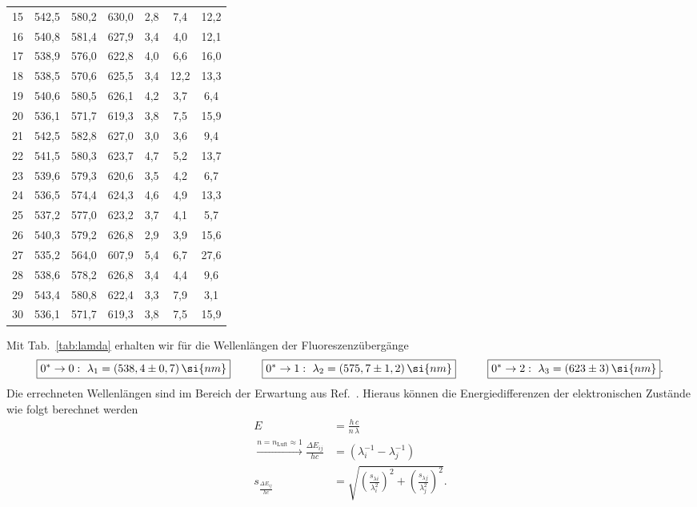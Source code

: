 \begin{table}[h!]
\begin{tabular}{c|c|c|c|c|c|c}
      15    & 542,5 & 580,2 & 630,0 & 2,8   & 7,4   & 12,2 \\
      16    & 540,8 & 581,4 & 627,9 & 3,4   & 4,0   & 12,1 \\
      17    & 538,9 & 576,0 & 622,8 & 4,0   & 6,6   & 16,0 \\
      18    & 538,5 & 570,6 & 625,5 & 3,4   & 12,2  & 13,3 \\
      19    & 540,6 & 580,5 & 626,1 & 4,2   & 3,7   & 6,4 \\
      20    & 536,1 & 571,7 & 619,3 & 3,8   & 7,5   & 15,9 \\
      21    & 542,5 & 582,8 & 627,0 & 3,0   & 3,6   & 9,4 \\
      22    & 541,5 & 580,3 & 623,7 & 4,7   & 5,2   & 13,7 \\
      23    & 539,6 & 579,3 & 620,6 & 3,5   & 4,2   & 6,7 \\
      24    & 536,5 & 574,4 & 624,3 & 4,6   & 4,9   & 13,3 \\
      25    & 537,2 & 577,0 & 623,2 & 3,7   & 4,1   & 5,7 \\
      26    & 540,3 & 579,2 & 626,8 & 2,9   & 3,9   & 15,6 \\
      27    & 535,2 & 564,0 & 607,9 & 5,4   & 6,7   & 27,6 \\
      28    & 538,6 & 578,2 & 626,8 & 3,4   & 4,4   & 9,6 \\
      29    & 543,4 & 580,8 & 622,4 & 3,3   & 7,9   & 3,1 \\
      30    & 536,1 & 571,7 & 619,3 & 3,8   & 7,5   & 15,9 \\
      \end{tabular}   
\end{table} \FloatBarrier
Mit Tab.~\ref{tab:lamda} erhalten wir für die Wellenlängen der Fluoreszenzübergänge
\begin{equation}
    \fbox{$0^{*}\rightarrow0:\,\,\lambda_{1} = (538,4 \pm 0,7)\,\si{nm}$}\hspace{1cm}
    \fbox{$0^{*}\rightarrow1:\,\,\lambda_{2} = (575,7 \pm 1,2)\,\si{nm}$}\hspace{1cm}
    \fbox{$0^{*}\rightarrow2:\,\,\lambda_{3} = (623 \pm 3)\,\si{nm}$}.
\end{equation}
Die errechneten Wellenlängen sind im Bereich der Erwartung aus Ref.~\cite{Anleitung}.
Hieraus können die Energiedifferenzen der elektronischen Zustände wie folgt berechnet werden
\begin{align}
    E &= \frac{h\,c}{n\,\lambda} \\
    \xrightarrow{n=n_{\text{Luft}}\approx 1} \frac{\Delta{E}_{ij}}{hc} &= \left(\lambda_{i}^{-1} - \lambda_{j}^{-1}\right) \\
    s_{\frac{\Delta{E}_{ij}}{hc}} &= \sqrt{\left(\frac{s_{\lambda{i}}}{\lambda_{i}^{2}}\right)^{2} + \left(\frac{s_{\lambda{j}}}{\lambda_{j}^{2}}\right)^{2}}.
\end{align}

